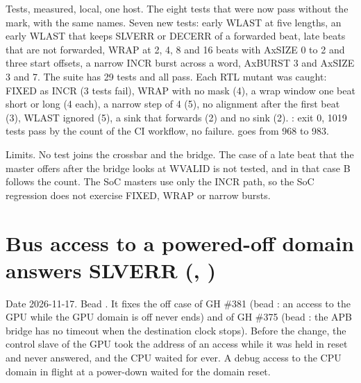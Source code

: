 \begin{record}

Tests, measured, local, one host. The eight tests that were  now pass without the mark, with the same names. Seven new tests: early WLAST at five lengths, an early WLAST that keeps SLVERR or DECERR of a forwarded beat, late beats that are not forwarded, WRAP at 2, 4, 8 and 16 beats with AxSIZE 0 to 2 and three start offsets, a narrow INCR burst across a word, AxBURST 3 and AxSIZE 3 and 7. The suite has 29 tests and all pass. Each RTL mutant was caught: FIXED as INCR (3 tests fail), WRAP with no mask (4), a wrap window one beat short or long (4 each), a narrow step of 4 (5), no alignment after the first beat (3), WLAST ignored (5), a sink that forwards (2) and no sink (2). : exit 0, 1019 tests pass by the count of the CI workflow, no failure.  goes from 968 to 983.

\end{record}

\begin{record}

Limits. No test joins the crossbar and the bridge. The case of a late beat that the master offers after the bridge looks at WVALID is not tested, and in that case B follows the count. The SoC masters use only the INCR path, so the SoC regression does not exercise FIXED, WRAP or narrow bursts.

\end{record}

\section{Bus access to a powered-off domain answers SLVERR (, )}\label{cr:defect:off-domain-slverr}

\begin{record}

Date 2026-11-17. Bead . It fixes the off case of GH \#381 (bead : an access to the GPU while the GPU domain is off never ends) and of GH \#375 (bead : the APB bridge has no timeout when the destination clock stops). Before the change, the control slave of the GPU took the address of an access while it was held in reset and never answered, and the CPU waited for ever. A debug access to the CPU domain in flight at a power-down waited for the domain reset.

\end{record}

